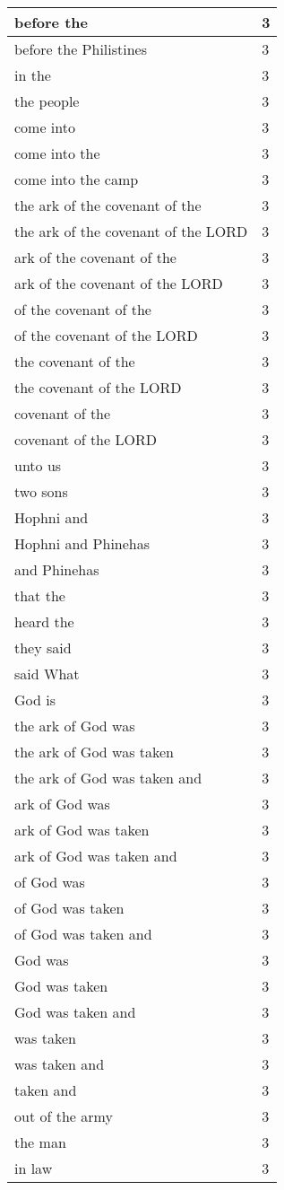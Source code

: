 \begin{center}
\begin{longtable}{|p{3.0in}|p{0.5in}|}
before the & 3\\ \hline 
before the Philistines & 3\\ \hline 
in the & 3\\ \hline 
the people & 3\\ \hline 
come into & 3\\ \hline 
come into the & 3\\ \hline 
come into the camp & 3\\ \hline 
the ark of the covenant of the & 3\\ \hline 
the ark of the covenant of the LORD & 3\\ \hline 
ark of the covenant of the & 3\\ \hline 
ark of the covenant of the LORD & 3\\ \hline 
of the covenant of the & 3\\ \hline 
of the covenant of the LORD & 3\\ \hline 
the covenant of the & 3\\ \hline 
the covenant of the LORD & 3\\ \hline 
covenant of the & 3\\ \hline 
covenant of the LORD & 3\\ \hline 
unto us & 3\\ \hline 
two sons & 3\\ \hline 
Hophni and & 3\\ \hline 
Hophni and Phinehas & 3\\ \hline 
and Phinehas & 3\\ \hline 
that the & 3\\ \hline 
heard the & 3\\ \hline 
they said & 3\\ \hline 
said What & 3\\ \hline 
God is & 3\\ \hline 
the ark of God was & 3\\ \hline 
the ark of God was taken & 3\\ \hline 
the ark of God was taken and & 3\\ \hline 
ark of God was & 3\\ \hline 
ark of God was taken & 3\\ \hline 
ark of God was taken and & 3\\ \hline 
of God was & 3\\ \hline 
of God was taken & 3\\ \hline 
of God was taken and & 3\\ \hline 
God was & 3\\ \hline 
God was taken & 3\\ \hline 
God was taken and & 3\\ \hline 
was taken & 3\\ \hline 
was taken and & 3\\ \hline 
taken and & 3\\ \hline 
out of the army & 3\\ \hline 
the man & 3\\ \hline 
in law & 3\\ \hline 
\end{longtable}
\end{center}





